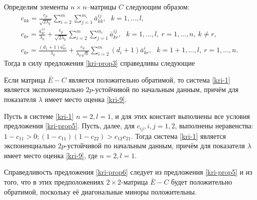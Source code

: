         Определим элементы
$n\times n$--матрицы $C$ следующим образом:
$$
\begin{array}{crl}
c_{kk}  = \frac{c_p}{\sqrt{2\lambda_k }}\sum
\limits_{i=2}^m \sum \limits_{j=1}^{m_i}\bar a^{ij}_{kk}, \ \ \ k = 1,\dots,l,\\
c_{kr} = \frac{\bar a^{11}_{kr}}{\lambda _k }+
\frac{c_p}{\sqrt{2\lambda_k }}\sum \limits_{i=2}^m \sum
\limits_{j=1}^{m_i}\bar a^{ij}_{kr}, \ \ \ k =
1,\dots,l, \ r = 1, \dots, n, \ k \neq r,\\
c_{kr} = \frac{(d_1+1)\bar a^{1}_{kr}}{\lambda_k} +
\frac{c_p}{\lambda_k\sqrt{h}} \sum \limits _{i=2}^{m}\mathrel (d_i +
1)\bar a^{i}_{kr}, \ \ \ k = 1 + 1,\dots,l,\ r = 1,\dots,n.
\end{array}
$$
Тогда в силу предложения \ref{kri-prop3} справедливы следующие

\begin{proposition}\label{kri-prop5}  Если матрица $\bar E - C$ является
положительно обратимой, то система \eqref{kri-1} является экспоненциально
${2p}$-устойчивой по начальным данным, причём для показателя
$\lambda$ имеет место оценка \eqref{kri-9}.
\end{proposition}

\begin{proposition}\label{kri-prop6} Пусть в системе \eqref{kri-1} $n = 2, l =1$, и
для этих констант выполнены все условия предложения \ref{kri-prop5}. Пусть, далее,
для $c_{ij}, i,j = 1, 2$, выполнены неравенства: $ 1 - c_{11}
> 0; (1 - c_{11})(1 - c_{22}) > c_{12}c_{21}$. Тогда система \eqref{kri-1}
является экспоненциально ${2p}$-устойчивой по начальным данным,
причём для показателя  $\lambda$ имеет место оценка \eqref{kri-9}, где $n = 2,
l =1$.
\end{proposition}

Справедливость предложения \ref{kri-prop6} следует из предложения \ref{kri-prop5} и из того, что в этих предположениях $2\times 2$-матрица $\bar E - C$ будет
положительно обратимой, поскольку её диагональные миноры положительны.


